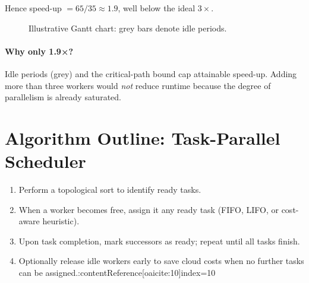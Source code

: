 \documentclass[11pt]{article}
\begin{document}
Hence speed-up $=65/35\approx1.9$, well below the ideal $3\times$.

\begin{figure}[h]
  \centering
  \caption{Illustrative Gantt chart: grey bars denote idle periods.}
  \label{fig:gantt}
\end{figure}

\paragraph{Why only 1.9×?}  
Idle periods (grey) and the critical-path bound cap attainable speed-up.  Adding more than three workers would \emph{not} reduce runtime because the degree of parallelism is already saturated.

\section{Algorithm Outline: Task-Parallel Scheduler}

\begin{enumerate}[itemsep=0pt]
  \item Perform a topological sort to identify ready tasks.
  \item When a worker becomes free, assign it any ready task (FIFO, LIFO, or cost-aware heuristic).
  \item Upon task completion, mark successors as ready; repeat until all tasks finish.
  \item Optionally release idle workers early to save cloud costs when no further tasks can be assigned.:contentReference[oaicite:10]{index=10}
\end{enumerate}
\end{document}
